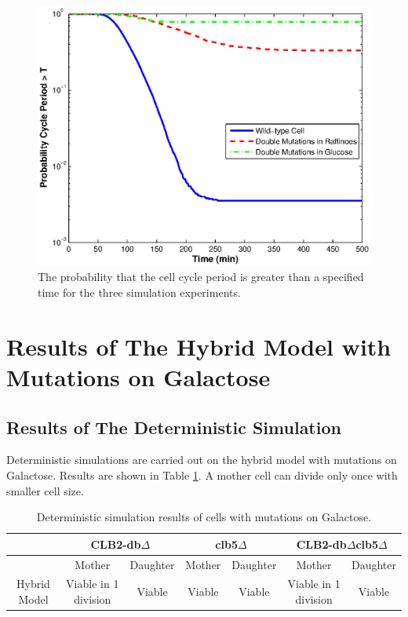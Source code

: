 \documentclass[12pt]{article}
\begin{document}
\begin{figure}[H]
  \centering
  \includegraphics[scale=.7]{./figure/cycle_prob.eps}
  \caption{The probability that the cell cycle period is greater than a specified time for the three 
           simulation experiments.}
  \label{fig:cycle_prob}
\end{figure}


\newpage
\section{Results of The Hybrid Model with Mutations on Galactose}
\subsection{Results of The Deterministic Simulation}
Deterministic simulations are carried out on the hybrid model with mutations on Galactose. 
Results are shown in Table \ref{tab:galactose}.
A mother cell can divide only once with smaller cell size.
\begin{table}[H]
  \centering
  \caption{Deterministic simulation results of cells with mutations on Galactose.}
  \vspace{0.2in}
  \begin{tabular}{|c|c|c|c|c|c|c|}
  \hline 
    \multirow{2}{*}{ } & 
    \multicolumn{2}{c|}{CLB2-db$\Delta$} & 
    \multicolumn{2}{c|}{clb5$\Delta$} & 
    \multicolumn{2}{c|}{CLB2-db$\Delta$clb5$\Delta$} \\
  \hline
    & Mother & Daughter & Mother & Daughter & Mother & Daughter \\
  \hline
  \hline  
  Hybrid Model  & Viable in 1 division  &  Viable  & Viable & Viable & Viable in 1 division & Viable \\
  \hline
  \end{tabular}
  \label{tab:galactose}
\end{table}
\end{document}
